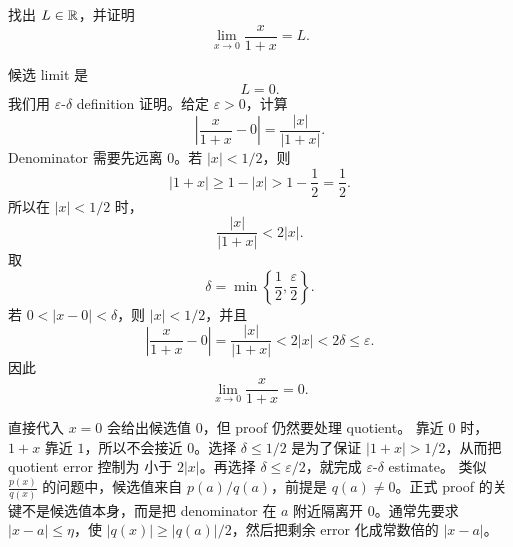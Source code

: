 \begin{exerciseblock}
找出 \(L\in\mathbb{R}\)，并证明
\[
  \lim_{x\to0}\frac{x}{1+x}=L.
\]
\end{exerciseblock}

\begin{solution}
候选 limit 是
\[
  L=0.
\]
我们用 \(\varepsilon\)-\(\delta\) definition 证明。给定
\(\varepsilon>0\)，计算
\[
  \left|\frac{x}{1+x}-0\right|
  =
  \frac{|x|}{|1+x|}.
\]
Denominator 需要先远离 \(0\)。若 \(|x|<1/2\)，则
\[
  |1+x|\geq 1-|x|>1-\frac12=\frac12.
\]
所以在 \(|x|<1/2\) 时，
\[
  \frac{|x|}{|1+x|}
  <
  2|x|.
\]
取
\[
  \delta=\min\left\{\frac12,\frac{\varepsilon}{2}\right\}.
\]
若 \(0<|x-0|<\delta\)，则 \(|x|<1/2\)，并且
\[
  \left|\frac{x}{1+x}-0\right|
  =
  \frac{|x|}{|1+x|}
  <
  2|x|
  <
  2\delta
  \leq
  \varepsilon.
\]
因此
\[
  \lim_{x\to0}\frac{x}{1+x}=0.
\]
\end{solution}

\begin{explanation}
直接代入 \(x=0\) 会给出候选值 \(0\)，但 proof 仍然要处理 quotient。
靠近 \(0\) 时，\(1+x\) 靠近 \(1\)，所以不会接近 \(0\)。选择
\(\delta\leq1/2\) 是为了保证 \(|1+x|>1/2\)，从而把 quotient error 控制为
小于 \(2|x|\)。再选择 \(\delta\leq\varepsilon/2\)，就完成
\(\varepsilon\)-\(\delta\) estimate。
类似 \(\frac{p(x)}{q(x)}\) 的问题中，候选值来自 \(p(a)/q(a)\)，前提是
\(q(a)\neq0\)。正式 proof 的关键不是候选值本身，而是把 denominator
在 \(a\) 附近隔离开 \(0\)。通常先要求 \(|x-a|\leq\eta\)，使
\(|q(x)|\geq |q(a)|/2\)，然后把剩余 error 化成常数倍的 \(|x-a|\)。
\end{explanation}
